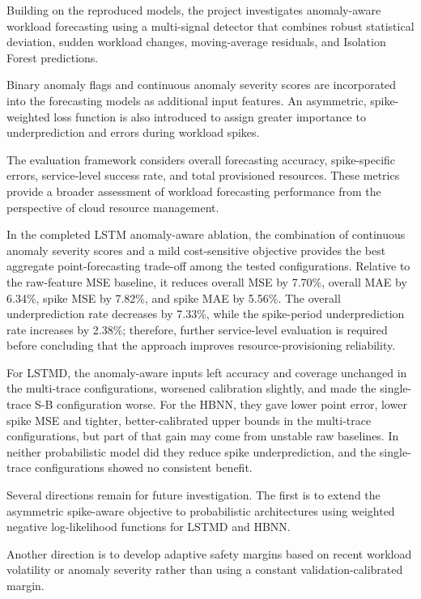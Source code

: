 \documentclass[conference]{IEEEtran}
\begin{document}
Building on the reproduced models, the project investigates anomaly-aware workload forecasting using a multi-signal detector that combines robust statistical deviation, sudden workload changes, moving-average residuals, and Isolation Forest predictions.

Binary anomaly flags and continuous anomaly severity scores are incorporated into the forecasting models as additional input features. An asymmetric, spike-weighted loss function is also introduced to assign greater importance to underprediction and errors during workload spikes.

The evaluation framework considers overall forecasting accuracy, spike-specific errors, service-level success rate, and total provisioned resources. These metrics provide a broader assessment of workload forecasting performance from the perspective of cloud resource management.

In the completed LSTM anomaly-aware ablation, the combination of continuous anomaly severity scores and a mild cost-sensitive objective provides the best aggregate point-forecasting trade-off among the tested configurations. Relative to the raw-feature MSE baseline, it reduces overall MSE by 7.70\%, overall MAE by 6.34\%, spike MSE by 7.82\%, and spike MAE by 5.56\%. The overall underprediction rate decreases by 7.33\%, while the spike-period underprediction rate increases by 2.38\%; therefore, further service-level evaluation is required before concluding that the approach improves resource-provisioning reliability.

For LSTMD, the anomaly-aware inputs left accuracy and coverage unchanged in the multi-trace configurations, worsened calibration slightly, and made the single-trace S-B configuration worse. For the HBNN, they gave lower point error, lower spike MSE and tighter, better-calibrated upper bounds in the multi-trace configurations, but part of that gain may come from unstable raw baselines. In neither probabilistic model did they reduce spike underprediction, and the single-trace configurations showed no consistent benefit.

Several directions remain for future investigation. The first is to extend the asymmetric spike-aware objective to probabilistic architectures using weighted negative log-likelihood functions for LSTMD and HBNN.

Another direction is to develop adaptive safety margins based on recent workload volatility or anomaly severity rather than using a constant validation-calibrated margin.
\end{document}
